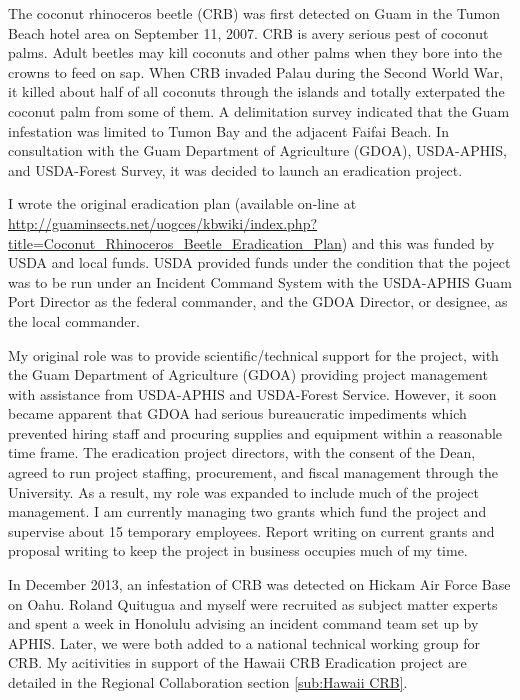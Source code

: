 \documentclass[12pt,oneside,english]{scrbook}
\begin{document}
The coconut rhinoceros beetle (CRB) was first detected on Guam in
the Tumon Beach hotel area on September 11, 2007. CRB is avery serious
pest of coconut palms. Adult beetles may kill coconuts and other palms
when they bore into the crowns to feed on sap. When CRB invaded Palau
during the Second World War, it killed about half of all coconuts
through the islands and totally exterpated the coconut palm from some
of them. A delimitation survey indicated that the Guam infestation
was limited to Tumon Bay and the adjacent Faifai Beach. In consultation
with the Guam Department of Agriculture (GDOA), USDA-APHIS, and USDA-Forest
Survey, it was decided to launch an eradication project. 

I wrote the original eradication plan (available on-line at \url{http://guaminsects.net/uogces/kbwiki/index.php?title=Coconut_Rhinoceros_Beetle_Eradication_Plan})
and this was funded by USDA and local funds. USDA provided funds under
the condition that the poject was to be run under an Incident Command
System with the USDA-APHIS Guam Port Director as the federal commander,
and the GDOA Director, or designee, as the local commander.

My original role was to provide scientific/technical support for the
project, with the Guam Department of Agriculture (GDOA) providing
project management with assistance from USDA-APHIS and USDA-Forest
Service. However, it soon became apparent that GDOA had serious bureaucratic
impediments which prevented hiring staff and procuring supplies and
equipment within a reasonable time frame. The eradication project
directors, with the consent of the Dean, agreed to run project staffing,
procurement, and fiscal management through the University. As a result,
my role was expanded to include much of the project management. I
am currently managing two grants which fund the project and supervise
about 15 temporary employees. Report writing on current grants and
proposal writing to keep the project in business occupies much of
my time. 

In December 2013, an infestation of CRB was detected on Hickam Air
Force Base on Oahu. Roland Quitugua and myself were recruited as subject
matter experts and spent a week in Honolulu advising an incident command
team set up by APHIS. Later, we were both added to a national technical
working group for CRB. My acitivities in support of the Hawaii CRB
Eradication project are detailed in the Regional Collaboration section
\ref{sub:Hawaii CRB}. 
\end{document}
